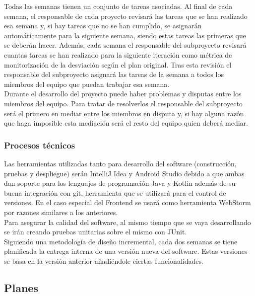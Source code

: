 \documentclass[12pt]{article}%
\begin{document}
Todas las semanas tienen un conjunto de tareas asociadas. Al final de cada semana, el responsable de cada proyecto revisar\'a las tareas que se han realizado esa semana y, si hay tareas que no se han cumplido, se asignar\'an autom\'aticamente para la siguiente semana, siendo estas tareas las primeras que se deber\'an hacer. Adem\'as, cada semana el responsable del subproyecto revisar\'a cuantas tareas se han realizado para la siguiente iteraci\'on  como m\'etrica de monitorizaci\'on de la desviaci\'on seg\'un el plan original. Tras esta revisi\'on el responsable del subproyecto asignar\'a las tareas de la semana a todos los miembros del equipo que puedan trabajar esa semana. \\

Durante el desarrollo del proyecto puede haber problemas y disputas entre los miembros del equipo. Para tratar de resolverlos el responsable del subproyecto ser\'a el primero en mediar entre los miembros en disputa y, si hay alguna raz\'on que haga imposible esta mediaci\'on ser\'a el resto del equipo quien deber\'a mediar. \\

\subsubsection{Procesos t\'ecnicos}
Las herramientas utilizadas tanto para desarrollo del software (construcci\'on, pruebas y despliegue) ser\'an IntelliJ Idea y Android Studio debido a que ambas dan soporte para los lenguajes de programaci\'on Java y Kotlin adem\'as de su buena integraci\'on con git, herramienta que se utilizar\'a para el control de versiones. En el caso especial del Frontend se usar\'a como herramienta WebStorm por razones similares a los anteriores.\\

Para asegurar la calidad del software, al mismo tiempo que se vaya desarrollando se ir\'an creando pruebas unitarias sobre el mismo con JUnit.\\

Siguiendo una metodolog\'ia de diseño incremental, cada dos semanas se tiene planificada la entrega interna de una versi\'on nueva del software.  Estas versiones se basa en la versi\'on anterior añadi\'endole ciertas funcionalidades.\\


\subsection{Planes}
\end{document}
